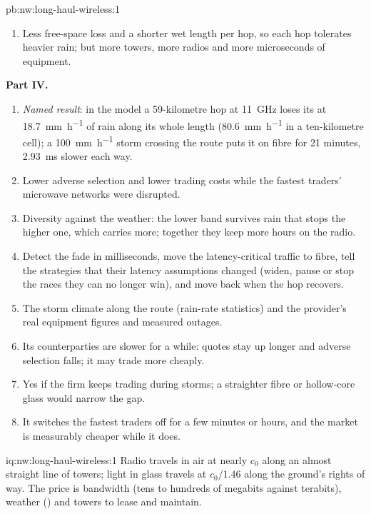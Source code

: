 \begin{solution}{pb:nw:long-haul-wireless:1}
\begin{enumerate}[resume]
\item Less free-space loss and a shorter wet length per hop, so each hop tolerates heavier rain; but more towers, more radios and more
  microseconds of equipment.
\end{enumerate}
\textbf{Part IV.}
\begin{enumerate}[resume]
\item \emph{Named result}: in the model a 59-kilometre hop at \qty{11}{\giga\hertz} loses its  at \qty{18.7}{\milli\metre\per\hour} of rain
  along its whole length (\qty{80.6}{\milli\metre\per\hour} in a ten-kilometre cell); a \qty{100}{\milli\metre\per\hour} storm crossing the route puts
  it on fibre for 21 minutes, \qty{2.93}{\milli\second} slower each way.
\item Lower adverse selection and lower trading costs while the fastest traders' microwave networks were disrupted.
\item Diversity against the weather: the lower band survives rain that stops the higher one, which carries more; together they keep more hours on
  the radio.
\item Detect the fade in milliseconds, move the latency-critical traffic to fibre, tell the strategies that their latency assumptions changed
  (widen, pause or stop the races they can no longer win), and move back when the hop recovers.
\item The storm climate along the route (rain-rate statistics) and the provider's real equipment figures and measured outages.
\item Its counterparties are slower for a while: quotes stay up longer and adverse selection falls; it may trade more cheaply.
\item Yes if the firm keeps trading during storms; a straighter fibre or hollow-core glass would narrow the gap.
\item It switches the fastest traders off for a few minutes or hours, and the market is measurably cheaper while it does.
\end{enumerate}
\end{solution}

\begin{solution}{iq:nw:long-haul-wireless:1}
Radio travels in air at nearly $c_0$ along an almost straight line of towers; light in glass travels at $c_0/1.46$ along the ground's rights of way.
The price is bandwidth (tens to hundreds of megabits against terabits), weather () and towers to lease and maintain.
\end{solution}

